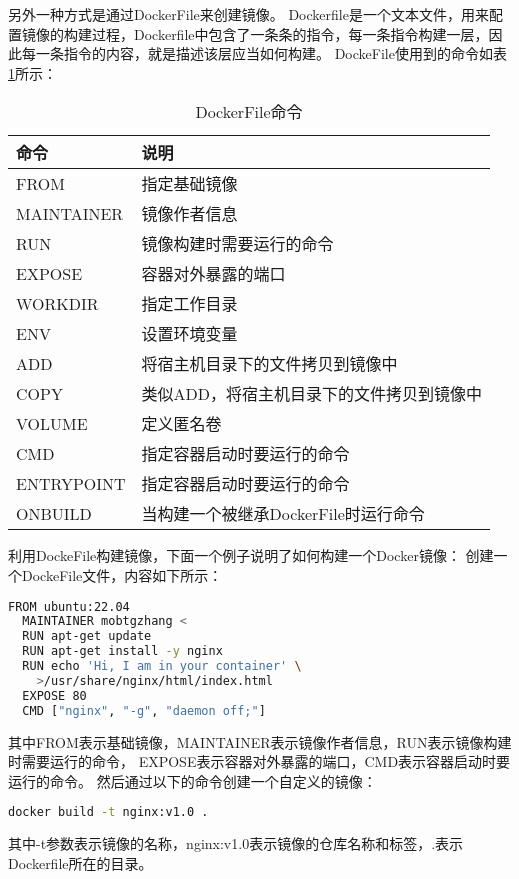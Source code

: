 \documentclass[lang=cn,a4paper,newtx]{elegantpaper}
\begin{document}
另外一种方式是通过DockerFile来创建镜像。
Dockerfile是一个文本文件，用来配置镜像的构建过程，Dockerfile中包含了一条条的指令，每一条指令构建一层，因此每一条指令的内容，就是描述该层应当如何构建。
DockeFile使用到的命令如表\ref{tab:dockerfile_command}所示：
\begin{table}[hbpt]
  \centering
  \caption{DockerFile命令}
  \label{tab:dockerfile_command}
  \begin{tabular}{p{}<{\centering}p{}<{\centering}}
    \toprule[1.5pt]
    \textbf{命令} & \textbf{说明} \\
    \midrule[1pt]
    FROM & 指定基础镜像 \\
    MAINTAINER & 镜像作者信息 \\
    RUN & 镜像构建时需要运行的命令 \\
    EXPOSE & 容器对外暴露的端口 \\
    WORKDIR & 指定工作目录 \\
    ENV & 设置环境变量 \\
    ADD & 将宿主机目录下的文件拷贝到镜像中 \\
    COPY & 类似ADD，将宿主机目录下的文件拷贝到镜像中 \\
    VOLUME & 定义匿名卷 \\
    CMD & 指定容器启动时要运行的命令 \\
    ENTRYPOINT & 指定容器启动时要运行的命令 \\
    ONBUILD & 当构建一个被继承DockerFile时运行命令 \\
    \bottomrule[1.5pt]
  \end{tabular}
\end{table}

利用DockeFile构建镜像，下面一个例子说明了如何构建一个Docker镜像：
创建一个DockeFile文件，内容如下所示：
\begin{lstlisting}[language=bash]
  FROM ubuntu:22.04
  MAINTAINER mobtgzhang <
  RUN apt-get update
  RUN apt-get install -y nginx
  RUN echo 'Hi, I am in your container' \
    >/usr/share/nginx/html/index.html
  EXPOSE 80
  CMD ["nginx", "-g", "daemon off;"]
\end{lstlisting}
其中FROM表示基础镜像，MAINTAINER表示镜像作者信息，RUN表示镜像构建时需要运行的命令，
EXPOSE表示容器对外暴露的端口，CMD表示容器启动时要运行的命令。
然后通过以下的命令创建一个自定义的镜像：
\begin{lstlisting}[language=bash]
  docker build -t nginx:v1.0 .
\end{lstlisting}
其中-t参数表示镜像的名称，nginx:v1.0表示镜像的仓库名称和标签，.表示Dockerfile所在的目录。
\end{document}
